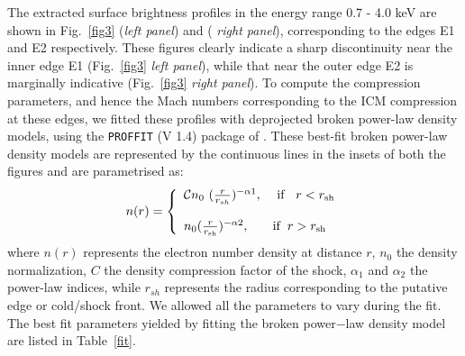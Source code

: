 \documentclass[useASM,usenatbib]{mn2e}
\begin{document}
The extracted surface brightness profiles in the energy range 0.7 -
4.0 keV are shown in Fig.~\ref{fig3} ({\it left panel}) and ({\it
  right panel}), corresponding to the edges E1 and E2
respectively. These figures clearly indicate a sharp discontinuity
near the inner edge E1 (Fig.~\ref{fig3} {\it left panel}), while that
near the outer edge E2 is marginally indicative (Fig.~\ref{fig3} {\it right
  panel}). To compute the compression parameters, and hence the Mach
numbers corresponding to the ICM compression at these edges, we fitted
these profiles with deprojected broken power-law density models, using
the {\tt PROFFIT} (V 1.4) package of
\cite{2011A&A...526A..79E}. These best-fit broken power-law density
models are represented by the continuous lines in the
insets of both the figures and are parametrised as:
\begin{equation} n(r)=\left\{\begin{array}{ll} \mathcal{C}n_{0}~(\frac{r}{r_{sh}})^{-\alpha1}, & \mbox{ if }\hspace{2mm}r <r_{\rm sh}\\\\
\mathcal{}n_{0}(\frac{r}{r_{\rm sh}})^{-\alpha2} , & \mbox{if}\hspace{2mm}  r > r_{\rm sh}\end{array}\right.
\end{equation}
where $n(r)$ represents the electron number density at distance $r$, $n_0$ the density normalization, $C$ the density compression factor of the shock, $\alpha_1$ and $\alpha_2$ the power-law indices, while $r_{sh}$ represents the radius corresponding to the putative edge or cold/shock front. We allowed all the parameters to vary during the fit. The best fit parameters yielded by fitting the broken power$-$law density model are listed in Table~\ref{fit}.
\end{document}
